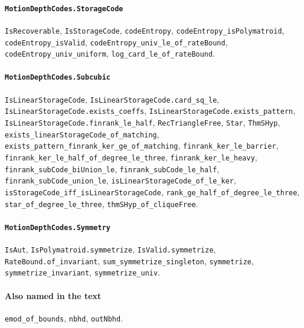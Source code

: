 \paragraph{\texttt{MotionDepthCodes.StorageCode}}
{\small\raggedright \texttt{IsRecoverable}, \texttt{IsStorageCode}, \texttt{codeEntropy}, \texttt{codeEntropy\_isPolymatroid}, \texttt{codeEntropy\_isValid}, \texttt{codeEntropy\_univ\_le\_of\_rateBound}, \texttt{codeEntropy\_univ\_uniform}, \texttt{log\_card\_le\_of\_rateBound}.\par}

\paragraph{\texttt{MotionDepthCodes.Subcubic}}
{\small\raggedright \texttt{IsLinearStorageCode}, \texttt{IsLinearStorageCode.card\_sq\_le}, \texttt{IsLinearStorageCode.exists\_coeffs}, \texttt{IsLinearStorageCode.exists\_pattern}, \texttt{IsLinearStorageCode.finrank\_le\_half}, \texttt{RecTriangleFree}, \texttt{Star}, \texttt{ThmSHyp}, \texttt{exists\_linearStorageCode\_of\_matching}, \texttt{exists\_pattern\_finrank\_ker\_ge\_of\_matching}, \texttt{finrank\_ker\_le\_barrier}, \texttt{finrank\_ker\_le\_half\_of\_degree\_le\_three}, \texttt{finrank\_ker\_le\_heavy}, \texttt{finrank\_subCode\_biUnion\_le}, \texttt{finrank\_subCode\_le\_half}, \texttt{finrank\_subCode\_union\_le}, \texttt{isLinearStorageCode\_of\_le\_ker}, \texttt{isStorageCode\_iff\_isLinearStorageCode}, \texttt{rank\_ge\_half\_of\_degree\_le\_three}, \texttt{star\_of\_degree\_le\_three}, \texttt{thmSHyp\_of\_cliqueFree}.\par}

\paragraph{\texttt{MotionDepthCodes.Symmetry}}
{\small\raggedright \texttt{IsAut}, \texttt{IsPolymatroid.symmetrize}, \texttt{IsValid.symmetrize}, \texttt{RateBound.of\_invariant}, \texttt{sum\_symmetrize\_singleton}, \texttt{symmetrize}, \texttt{symmetrize\_invariant}, \texttt{symmetrize\_univ}.\par}

\paragraph{Also named in the text}
{\small\raggedright \texttt{emod\_of\_bounds}, \texttt{nbhd}, \texttt{outNbhd}.\par}

